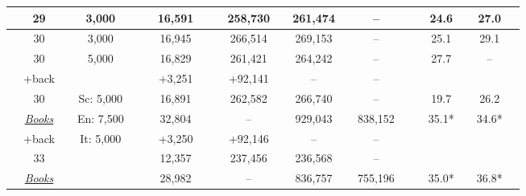 \begin{table}[t]
\begin{center}
\begin{tabular}{ccccc|ccc|ccccccc|ccccc}
      &  29  & &  3,000 & & & 16,591  & & &  258,730  & &  261,474  & & --  & & &  24.6  & &  27.0  & \\
      \hline
      &  30  & &  3,000  & & & 16,945  & & &  266,514  & &  269,153  & & --  & & &  25.1  & &  29.1  & \\
      \hline
      &  30  & &  5,000  & & & 16,829  & & &  261,421  & &  264,242  & & --  & & &  27.7  & &  --    & \\
      &  +back  & &      & & & +3,251  & & &  +92,141  & &    --     & & --  & & &        & &        & \\
      \hline
      &  30     & &  Sc: 5,000  & & & 16,891  & & &  262,582  & &  266,740  & &   --       & & &  19.7  & &  26.2  & \\
      &  \textit{\href{https://farkastranslations.com/bilingual_books.php}{Books}}
                & &  En: 7,500  & & & 32,804  & & &   --      & &  929,043  & &  838,152   & & &  35.1* & &  34.6* & \\
      &  +back  & &  It: 5,000  & & & +3,250  & & &  +92,146  & &   --      & &   --       & & &        & &        & \\
      \hline
      &  33      & &            & & & 12,357  & & &  237,456  & &  236,568  & &  --      & & &          & &        & \\
      &  \textit{\href{https://farkastranslations.com/bilingual_books.php}{Books}}
                 & &            & & & 28,982 & & &   --      & &  836,757  & & 755,196  & & &  35.0* & &  36.8* & \\


\end{tabular}
\end{center}
\end{table}
